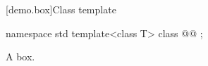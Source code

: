 [demo.box]{Class template }

\begin{codeblock}
namespace std {
  template<class T>
  class @@ {};
}
\end{codeblock}

\pnum
\remarks
A box.

